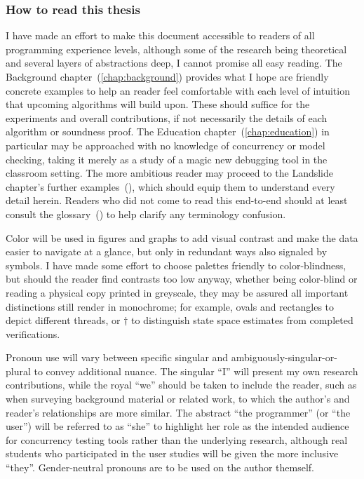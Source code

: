\subsubsection{How to read this thesis}

I have made an effort to make this document accessible to readers of all programming experience levels,
although some of the research being theoretical and several layers of abstractions deep,
I cannot promise all easy reading.
The Background chapter~(\ref{chap:background}) provides what I hope are friendly concrete examples
to help an reader feel comfortable with each level of intuition that upcoming algorithms will build upon.
These should suffice for the experiments and overall contributions,
if not necessarily the details of each algorithm or soundness proof.
The Education chapter~(\ref{chap:education}) in particular
may be approached with no knowledge of concurrency or model checking,
taking it merely as a study of a magic new debugging tool in the classroom setting.
The more ambitious reader may proceed to the Landslide chapter's further examples~(\sect{\ref{sec:landslide-algs}}),
which should equip them to understand every detail herein.
Readers who did not come to read this end-to-end should at least consult the glossary~(\sect{\ref{sec:glossary}})
to help clarify any terminology confusion.

Color will be used in figures and graphs to add visual contrast and make the data easier to navigate at a glance,
but only in redundant ways also signaled by symbols.
I have made some effort to choose palettes friendly to color-blindness,
but should the reader find contrasts too low anyway,
whether being color-blind or reading a physical copy printed in greyscale,
they may be assured all important distinctions still render in monochrome;
for example, ovals and rectangles to depict different threads,
or $\dagger$ to distinguish state space estimates from completed verifications.

Pronoun use will vary between specific singular and ambiguously-singular-or-plural to convey additional nuance.
The singular ``I'' will present my own research contributions,
while the royal ``we'' should be taken to include the reader,
such as when surveying background material or related work,
to which the author's and reader's relationships are more similar.
The abstract ``the programmer'' (or ``the user'') will be referred to as ``she''
to highlight her role as the intended audience for concurrency testing tools
rather than the underlying research,
although real students who participated in the user studies will be given the more inclusive ``they''.
Gender-neutral pronouns are to be used on the author themself.

